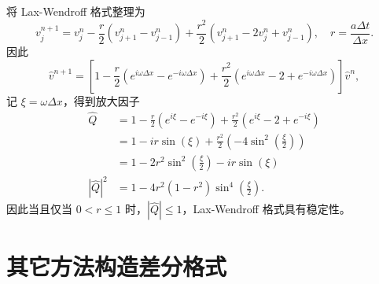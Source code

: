 \begin{solution*}
    将 Lax-Wendroff 格式整理为
    \[
        v_{j}^{n+1}
        = v_j^n - \frac{r}2(v_{j+1}^n- v_{j-1}^n) + \frac{r^2}2
        (v_{j+1}^n-2v_{j}^n+v_{j-1}^n),
        \quad r = \frac{a \Delta t}{\Delta x}.
    \]
    因此
    \[
        \hat{v}^{n+1} = \left[
            1 - \frac{r}2(e^{i \omega \Delta x} - e^{- i \omega \Delta x})
            + \frac{r^2}2 (e^{i \omega \Delta x} - 2 + e^{- i \omega \Delta x})
            \right] \hat{v}^n,
    \]
    记 $\xi = \omega \Delta x$，得到放大因子
    \begin{align*}
        \widehat{Q}
                        & = 1 - \frac{r}2(e^{i \xi} - e^{- i \xi})
        + \frac{r^2}2 (e^{i \xi} - 2 + e^{- i \xi})
        \\
                        & =
        1 -  i r \sin(\xi) + \frac{r^2}2 (-4 \sin^2(\frac{\xi}2))
        \\
                        & = 1 - 2r^2 \sin^2(\frac{\xi}2)
        - i r \sin(\xi)                                            \\
        |\widehat{Q}|^2 & =
        1 - 4 r^2 (1-r^2) \sin^4(\frac{\xi}2).
    \end{align*}
    因此当且仅当 $0 < r \le 1$ 时，$|\widehat{Q}| \le 1$，Lax-Wendroff 格式具有稳定性。
\end{solution*}


\section{其它方法构造差分格式}

